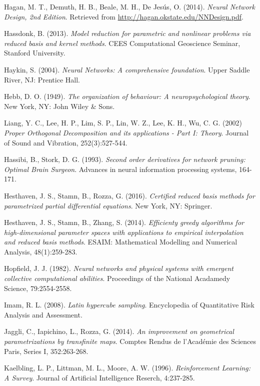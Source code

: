 \documentclass[12pt, a4paper, twoside, openright, notitlepage]{report}
\numberwithin{equation}{chapter}
\theoremstyle{theorem}
\theoremstyle{definition}
\theoremstyle{remark}
\theoremstyle{proposition}
\numberwithin{figure}{chapter}
\begin{document}
\begin{thebibliography}{50}
		Hagan, M. T., Demuth, H. B., Beale, M. H., De Jes\'us, O. (2014). \emph{Neural Network Design, 2nd Edition}. Retrieved from \url{http://hagan.okstate.edu/NNDesign.pdf}.
		
		Hassdonk, B. (2013). \emph{Model reduction for parametric and nonlinear problems via reduced basis and kernel methods}. CEES Computational Geoscience Seminar, Stanford University.
		
		Haykin, S. (2004). \emph{Neural Networks: A comprehensive foundation}. Upper Saddle River, NJ: Prentice Hall.
		
		Hebb, D. O. (1949). \emph{The organization of behaviour: A neuropsychological theory}. New York, NY: John Wiley \& Sons. 
		
		Liang, Y. C., Lee, H. P., Lim, S. P., Lin, W. Z., Lee, K. H., Wu, C. G. (2002) \emph{Proper Orthogonal Decomposition and its applications - Part I: Theory}. Journal of Sound and Vibration, 252(3):527-544.
		
		Hassibi, B., Stork, D. G. (1993). \emph{Second order derivatives for network pruning: Optimal Brain Surgeon}. Advances in neural information processing systems, 164-171.
		
		Hesthaven, J. S., Stamn, B., Rozza, G. (2016). \emph{Certified reduced basis methods for parametrized partial differential equations}. New York, NY: Springer.
		
		Hesthaven, J. S., Stamn, B., Zhang, S. (2014). \emph{Efficienty greedy algorithms for high-dimensional parameter spaces with applications to empirical interpolation and reduced basis methods}. ESAIM: Mathematical Modelling and Numerical Analysis, 48(1):259-283.
		
		Hopfield, J. J. (1982). \emph{Neural networks and physical systems with emergent collective computational abilities}. Proceedings of the National Acadamedy Science, 79:2554-2558.
		
		Imam, R. L. (2008). \emph{Latin hypercube sampling}. Encyclopedia of Quantitative Risk Analysis and Assessment.
		
		Jaggli, C., Iapichino, L., Rozza, G. (2014). \emph{An improvement on geometrical parametrizations by transfinite maps}. Comptes Rendus de l'Acad\'emie des Sciences Paris, Series I, 352:263-268. 
				
		Kaelbling, L. P., Littman, M. L., Moore, A. W. (1996). \emph{Reinforcement Learning: A Survey}. Journal of Artificial Intelligence Reserch, 4:237-285.
		

\end{thebibliography}
\end{document}
